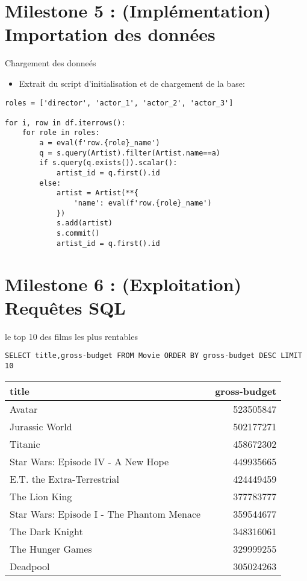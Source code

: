 \documentclass[french]{beamer}
\begin{document}
\section{Milestone 5 : (Implémentation) Importation des données}
\label{sec:org09e848e}
\begin{frame}[label={sec:org182091a},fragile]{Chargement des donneés}
 \begin{itemize}
\item Extrait du script d'initialisation et de chargement de la base:
\end{itemize}

\begin{verbatim}
roles = ['director', 'actor_1', 'actor_2', 'actor_3']

for i, row in df.iterrows():
    for role in roles:
        a = eval(f'row.{role}_name')
        q = s.query(Artist).filter(Artist.name==a)
        if s.query(q.exists()).scalar():
            artist_id = q.first().id
        else:
            artist = Artist(**{
                'name': eval(f'row.{role}_name')
            })
            s.add(artist)
            s.commit()
            artist_id = q.first().id
\end{verbatim}
\end{frame}


\section{Milestone 6 : (Exploitation) Requêtes SQL}
\label{sec:orgec4d481}
\begin{frame}[label={sec:org01f8d3b},fragile]{le top 10 des films les plus rentables}
 \begin{verbatim}
SELECT title,gross-budget FROM Movie ORDER BY gross-budget DESC LIMIT 10
\end{verbatim}

\begin{center}
\begin{tabular}{lr}
title & gross-budget\\
\hline
Avatar  & 523505847\\
Jurassic World  & 502177271\\
Titanic  & 458672302\\
Star Wars: Episode IV - A New Hope  & 449935665\\
E.T. the Extra-Terrestrial  & 424449459\\
The Lion King  & 377783777\\
Star Wars: Episode I - The Phantom Menace  & 359544677\\
The Dark Knight  & 348316061\\
The Hunger Games  & 329999255\\
Deadpool  & 305024263\\
\end{tabular}
\end{center}
\end{frame}
\end{document}

